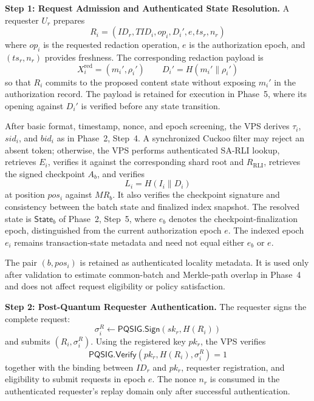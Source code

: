 \documentclass[lettersize,journal]{IEEEtran}
\begin{document}
\medskip
\noindent\textbf{Step 1: Request Admission and Authenticated State
Resolution.}
A requester $U_r$ prepares
\begin{equation}
R_i=(ID_r,TID_i,op_i,D_i',e,ts_r,n_r)
\end{equation}
where $op_i$ is the requested redaction operation, $e$ is the
authorization epoch, and $(ts_r,n_r)$ provides freshness. The
corresponding redaction payload is
\begin{equation}
X_i^{\mathrm{red}}=(m_i',\rho_i')
\qquad
D_i'=H(m_i'\parallel\rho_i')
\end{equation}
so that $R_i$ commits to the proposed content state without exposing
$m_i'$ in the authorization record. The payload is retained for
execution in Phase~5, where its opening against $D_i'$ is verified
before any state transition.

After basic format, timestamp, nonce, and epoch screening, the VPS
derives $\tau_i$, $sid_i$, and $bid_i$ as in Phase~2, Step~4. A
synchronized Cuckoo filter may reject an absent token; otherwise, the
VPS performs authenticated SA-RLI lookup, retrieves $E_i$, verifies it
against the corresponding shard root and
$R_{\mathrm{RLI}}$, retrieves the signed checkpoint $A_b$, and verifies
\begin{equation}
L_i=H(I_i\parallel D_i)
\end{equation}
at position $pos_i$ against $MR_b$. It also verifies the checkpoint
signature and consistency between the batch state and finalized index
snapshot. The resolved state is $\mathsf{State}_b$ of Phase~2, Step~5,
where $e_b$ denotes the checkpoint-finalization epoch, distinguished
from the current authorization epoch $e$. The indexed epoch $e_i$
remains transaction-state metadata and need not equal either $e_b$ or
$e$.

The pair $(b,pos_i)$ is retained as authenticated locality metadata.
It is used only after validation to estimate common-batch and
Merkle-path overlap in Phase~4 and does not affect request eligibility
or policy satisfaction.

\medskip
\noindent\textbf{Step 2: Post-Quantum Requester Authentication.}
The requester signs the complete request:
\begin{equation}
\sigma_i^R\leftarrow
\mathsf{PQSIG.Sign}(sk_r,H(R_i))
\end{equation}
and submits $(R_i,\sigma_i^R)$. Using the registered key $pk_r$, the
VPS verifies
\begin{equation}
\mathsf{PQSIG.Verify}
(pk_r,H(R_i),\sigma_i^R)=1
\label{eq:req_sig}
\end{equation}
together with the binding between $ID_r$ and $pk_r$, requester
registration, and eligibility to submit requests in epoch $e$.
The nonce $n_r$ is consumed in the authenticated requester's replay
domain only after successful authentication.
\end{document}

